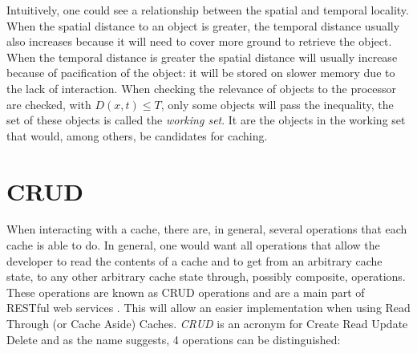 \documentclass[pdftex,a4paper,12pt,twoside]{report}
\begin{document}
Intuitively, one could see a relationship between the spatial and temporal locality. When the spatial distance to an object is greater, the temporal distance usually also increases because it will need to cover more ground to retrieve the object. When the temporal distance is greater the spatial distance will usually increase because of pacification of the object: it will be stored on slower memory due to the lack of interaction.
When checking the relevance of objects to the processor are checked, with $D(x,t) \leq T$, only some objects will pass the inequality, the set of these objects is 
called the \emph{working set}. It are the objects in the working set that would, among others, be candidates for caching. 
\section{CRUD}
When interacting with a cache, there are, in general, several operations that each cache is able to do. In general, one would want all operations that allow the developer to read the contents of a cache and to get from an arbitrary cache state, to any other arbitrary cache state through, possibly composite, operations. These operations are known as CRUD operations and are a main part of RESTful web services \citep{battle2008bridging}. This will allow an easier implementation when using Read Through (or Cache Aside) Caches.
\emph{CRUD} is an acronym for Create Read Update Delete and as the name suggests, 4 operations can be distinguished:
\end{document}
